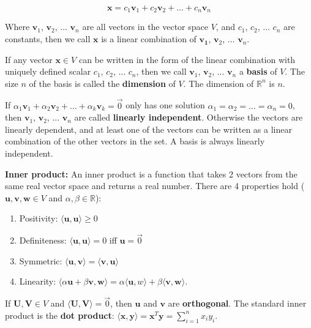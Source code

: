 \documentclass[12pt]{article}
\begin{document}
$$\mathbf{x} = c_1\mathbf{v}_1+ c_2\mathbf{v}_2 + \dots + c_n\mathbf{v}_n$$

Where $\mathbf{v}_1$, $\mathbf{v}_2$, ... $\mathbf{v}_n$ are all vectors in the vector space $V$, and $c_1$, $c_2$, ... $c_n$ are constants, then we call $\mathbf{x}$ is a linear combination of $\mathbf{v_1}$, $\mathbf{v}_2$, ... $\mathbf{v}_n$.

If any vector $\mathbf{x} \in V$ can be written in the form of the linear combination with uniquely defined scalar $c_1$, $c_2$, ... $c_n$, then we call $\mathbf{v}_1$, $\mathbf{v}_2$, ... $\mathbf{v}_n$ a \textbf{basis} of $V$. The size $n$ of the basis is called the \textbf{dimension} of $V$. The dimension of $\mathbb{R}^n$ is $n$.

If $\alpha_1\mathbf{v}_1 + \alpha_2\mathbf{v}_2 + \dots + \alpha_k\mathbf{v}_k = \vec{0}$ only has one solution $\alpha_1 = \alpha_2 
 = \dots = \alpha_n = 0$, then $\mathbf{v}_1$, $\mathbf{v}_2$, ... $\mathbf{v}_n$ are called \textbf{linearly independent}. Otherwise the vectors are linearly dependent, and at least one of the vectors can be written as a linear combination of the other vectors in the set. A basis is always linearly independent.

\medskip
\noindent \textbf{Inner product:} An inner product is a function that takes 2 vectors from the same real vector space and returns a real number. There are 4 properties hold ($\mathbf{u}, \mathbf{v}, \mathbf{w} \in V$ and $\alpha, \beta \in \mathbb{R}$): 
    \begin{enumerate}
        \item Positivity: $\langle \mathbf{u}, \mathbf{u} \rangle \geq 0$
        \item Definiteness: $\langle \mathbf{u}, \mathbf{u} \rangle = 0$ iff $\mathbf{u} = \vec{0}$
        \item Symmetric: $\langle \mathbf{u}, \mathbf{v} \rangle = \langle \mathbf{v}, \mathbf{u} \rangle$
        \item Linearity: $\langle \alpha \mathbf{u} + \beta \mathbf{v}, \mathbf{w} \rangle = \alpha \langle \mathbf{u}, w \rangle + \beta \langle \mathbf{v}, \mathbf{w} \rangle$.
    \end{enumerate}

If $\mathbf{U}, \mathbf{V} \in V$ and $\langle \mathbf{U}, \mathbf{V} \rangle = \vec{0}$, then $\mathbf{u}$ and $\mathbf{v}$ are \textbf{orthogonal}. The standard inner product is the \textbf{dot product}: $\langle \mathbf{x}, \mathbf{y}\rangle = \mathbf{x}^T\mathbf{y} = \sum_{i=1}^nx_i y_i$.
\end{document}

